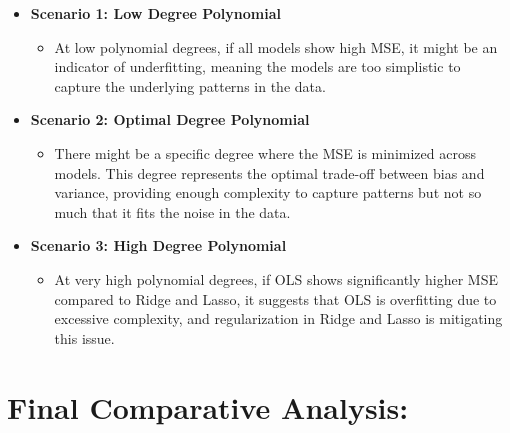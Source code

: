 \documentclass{article}
\begin{document}
\begin{itemize}
   \item \textbf{Scenario 1: Low Degree Polynomial}
      \begin{itemize}
         \item At low polynomial degrees, if all models show high MSE, it might be an indicator of underfitting, meaning the models are too simplistic to capture the underlying patterns in the data.
      \end{itemize}

   \item \textbf{Scenario 2: Optimal Degree Polynomial}
      \begin{itemize}
         \item There might be a specific degree where the MSE is minimized across models. This degree represents the optimal trade-off between bias and variance, providing enough complexity to capture patterns but not so much that it fits the noise in the data.
      \end{itemize}

   \item \textbf{Scenario 3: High Degree Polynomial}
      \begin{itemize}
         \item At very high polynomial degrees, if OLS shows significantly higher MSE compared to Ridge and Lasso, it suggests that OLS is overfitting due to excessive complexity, and regularization in Ridge and Lasso is mitigating this issue.
      \end{itemize}
\end{itemize}

\section*{Final Comparative Analysis:}
\end{document}
